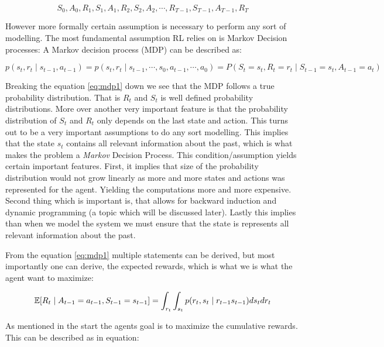 \begin{equation}
    S_0, A_0, R_1, S_1, A_1, R_2, S_2, A_2, \cdots ,R_{T-1}, S_{T-1}, A_{T-1}, R_{T}
\end{equation}

However more formally certain assumption is necessary to perform any sort of modelling. The most fundamental assumption RL relies on is Markov Decision processes: A Markov decision process (MDP) can be described as:

\begin{equation}\label{eq:mdp1}
    p(s_t, r_t \mid s_{t-1},  a_{t-1}) = p(s_t, r_t \mid s_{t-1},\cdots, s_{0}, a_{t-1}, \cdots, a_{0}) = P(S_t = s_t, R_t = r_t \mid S_{t-1} = s_t, A_{t-1} = a_t)
\end{equation}

Breaking the equation \eqref{eq:mdp1} down we see that the MDP follows a true probability distribution. That is $R_t$ and $S_t$ is well defined probability distributions. More over another very important feature is that the probability distribution of $S_t$ and $R_t$ only depends on the last state and action. This turns out to be a very important assumptions to do any sort modelling. This implies that the state $s_t$ contains all relevant information about the past, which is what makes the problem a \textit{Markov} Decision Process. This condition/assumption yields certain important features. First, it implies that size of the probability distribution would not grow linearly as more and more states and actions was represented for the agent. Yielding the computations more and more expensive. Second thing which is important is, that allows for backward induction and dynamic programming (a topic which will be discussed later). Lastly this implies than when we model the system we must ensure that the state is represents all relevant information about the past.

From the equation \eqref{eq:mdp1} multiple statements can be derived, but most importantly one can derive, the expected rewards, which is what we is what the agent want to maximize:

\begin{equation}
    \mathbb{E}[R_t \mid A_{t-1} = a_{t-1}, S_{t-1} = {s_{t-1}}] = \int_{r_t} \int_{s_t} p(r_t, s_t \mid r_{t-1} s_{t-1}) d s_t d r_t 
\end{equation}

As mentioned in the start the agents goal is to maximize the cumulative rewards. This can be described as in equation:

